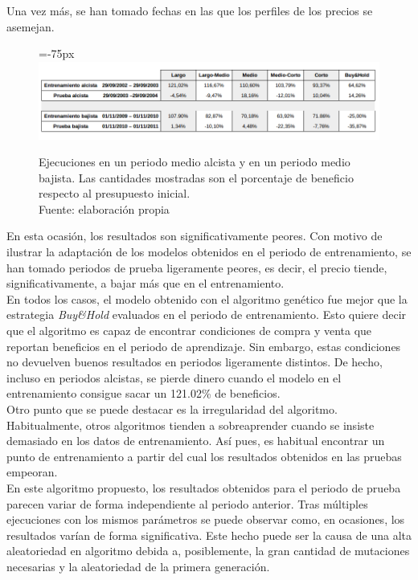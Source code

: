 Una vez m\'as, se han tomado fechas en las que los perfiles de los precios se asemejan. \\

     	\begin{figure}[H]
     		\centering\leftskip=-75px
     		\includegraphics[scale=0.60]{imagenes/Medium_period.png}
     		\caption[Ejecuciones en un periodo medio alcista y en un periodo medio bajista]{Ejecuciones en un periodo medio alcista y en un periodo medio bajista. Las cantidades mostradas son el porcentaje de beneficio respecto al presupuesto inicial.\\ Fuente: elaboraci\'on propia}
     		\label{fig:medium_period}
     	\end{figure}
     	
En esta ocasi\'on, los resultados son significativamente peores. Con motivo de ilustrar la adaptaci\'on de los modelos obtenidos en el periodo de entrenamiento, se han tomado periodos de prueba ligeramente peores, es decir, el precio tiende, significativamente, a bajar m\'as que en el entrenamiento.\\

En todos los casos, el modelo obtenido con el algoritmo gen\'etico fue mejor que la estrategia \textit{Buy\&Hold} evaluados en el periodo de entrenamiento. Esto quiere decir que el algoritmo es capaz de encontrar condiciones de compra y venta que reportan beneficios en el periodo de aprendizaje. Sin embargo, estas condiciones no devuelven buenos resultados en periodos ligeramente distintos. De hecho, incluso en periodos alcistas, se pierde dinero cuando el modelo en el entrenamiento consigue sacar un 121.02\% de beneficios.\\

Otro punto que se puede destacar es la irregularidad del algoritmo. Habitualmente, otros algoritmos tienden a sobreaprender cuando se insiste demasiado en los datos de entrenamiento. As\'i pues, es habitual encontrar un punto de entrenamiento a partir del cual los resultados obtenidos en las pruebas empeoran.\\

En este algoritmo propuesto, los resultados obtenidos  para el periodo de prueba parecen variar de forma independiente al periodo anterior. Tras m\'ultiples ejecuciones con los mismos par\'ametros se puede observar como, en ocasiones, los resultados var\'ian de forma significativa. Este hecho puede ser la causa de una alta aleatoriedad en algoritmo debida a, posiblemente, la gran cantidad de mutaciones necesarias y la aleatoriedad de la primera generaci\'on.\\

